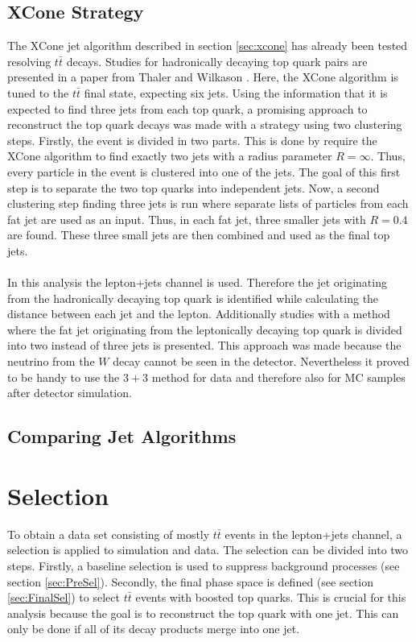 \subsection{XCone Strategy}
	The XCone jet algorithm described in section \ref{sec:xcone} has already been tested resolving $t\bar{t}$ decays. Studies for hadronically decaying top quark pairs are presented in a paper from Thaler and Wilkason \cite{xconetop}. Here, the XCone algorithm is tuned to the $t\bar{t}$ final state, expecting six jets. Using the information that it is expected to find three jets from each top quark, a promising approach to reconstruct the top quark decays was made with a strategy using two clustering steps. Firstly, the event is divided in two parts. This is done by require the XCone algorithm to find exactly two jets with a radius parameter $R=\infty$. Thus, every particle in the event is clustered into one of the jets. The goal of this first step is to separate the two top quarks into independent jets. Now, a second clustering step finding three jets is run where separate lists of particles from each fat jet are used as an input. Thus, in each fat jet, three smaller jets with $R=0.4$ are found. These three small jets are then combined and used as the final top jets. \\
	\\ In this analysis the lepton+jets channel is used. Therefore the jet originating from the hadronically decaying top quark is identified while calculating the distance between each jet and the lepton. Additionally studies with a method where the fat jet originating from the leptonically decaying top quark is divided into two instead of three jets is presented. This approach was made because the neutrino from the $W$ decay cannot be seen in the detector. Nevertheless it proved to be handy to use the $3+3$ method for data and therefore also for MC samples after detector simulation.   
\subsection{Comparing Jet Algorithms}

\section{Selection}
	To obtain a data set consisting of mostly $t\bar{t}$ events in the lepton+jets channel, a selection is applied to simulation and data. The selection can be divided into two steps. Firstly, a baseline selection is used to suppress background processes (see section \ref{sec:PreSel}). Secondly, the final phase space is defined (see section \ref{sec:FinalSel}) to select $t\bar{t}$ events with boosted top quarks. This is crucial for this analysis because the goal is to reconstruct the top quark with one jet. This can only be done if all of its decay products merge into one jet.
